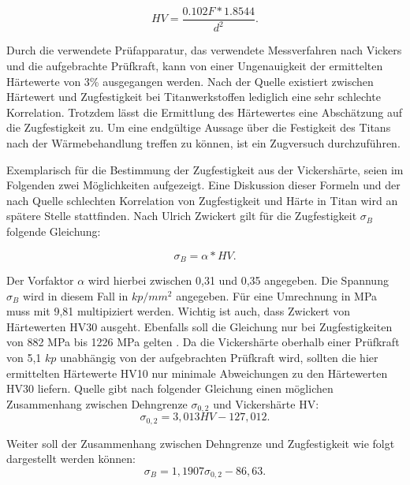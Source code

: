 \documentclass[a4paper, 11pt]{tubsreprt}
\begin{document}
\begin{equation}
HV = \frac{ 0.102 F * 1.8544 }{ d^{ 2 } }.
\label{Vickershärte formel}
\end{equation}


Durch die verwendete Prüfapparatur, das verwendete Messverfahren nach Vickers und die aufgebrachte Prüfkraft, kann von einer Ungenauigkeit der ermittelten Härtewerte von 3\% ausgegangen werden.
Nach der Quelle \cite{Donachie2001} existiert zwischen Härtewert und Zugfestigkeit bei Titanwerkstoffen lediglich eine sehr schlechte Korrelation. Trotzdem lässt die Ermittlung des Härtewertes eine Abschätzung auf die Zugfestigkeit zu. Um eine endgültige Aussage über die Festigkeit des Titans nach der Wärmebehandlung treffen zu können, ist ein Zugversuch durchzuführen.


Exemplarisch für die Bestimmung der Zugfestigkeit aus der Vickershärte, seien im Folgenden zwei Möglichkeiten aufgezeigt. Eine Diskussion dieser Formeln und der nach Quelle \cite{Donachie2001} schlechten Korrelation von Zugfestigkeit und Härte in Titan wird an spätere Stelle stattfinden.
Nach Ulrich Zwickert gilt für die Zugfestigkeit  $\sigma_{B}$  folgende Gleichung:

\begin{equation}
\sigma_{B}=\alpha*HV.
\label{Zugfestigkeit}
\end{equation}

Der Vorfaktor $\alpha$ wird hierbei zwischen 0,31 und 0,35 angegeben. Die Spannung $\sigma_{B}$ wird in diesem Fall in $kp/mm^{2}$ angegeben. Für eine Umrechnung in MPa muss mit 9,81 multipiziert werden. Wichtig ist auch, dass Zwickert von Härtewerten HV30 ausgeht. Ebenfalls soll die Gleichung nur bei Zugfestigkeiten von 882 MPa bis 1226 MPa gelten \cite{Zwicker1974}. Da die Vickershärte oberhalb einer Prüfkraft von 5,1 $kp$ unabhängig von der aufgebrachten Prüfkraft wird, sollten die hier ermittelten Härtewerte HV10 nur minimale Abweichungen zu den Härtewerten HV30 liefern. 
Quelle \cite{Shi2013} gibt nach folgender Gleichung einen möglichen Zusammenhang zwischen Dehngrenze $\sigma_{0,2}$ und Vickershärte HV:
\begin{equation}
\sigma_{0,2} = 3,013 HV - 127,012.
\label{Formel zusammenhang dehngrenze vickershärte}
\end{equation}

Weiter soll der Zusammenhang zwischen Dehngrenze und Zugfestigkeit wie folgt dargestellt werden können: 
\begin{equation}
\sigma_{B} = 1,1907\sigma_{0,2} - 86,63.
\label{Formel zusammenhang dehngrenze und Zugfestigkeit}
\end{equation}
\end{document}
